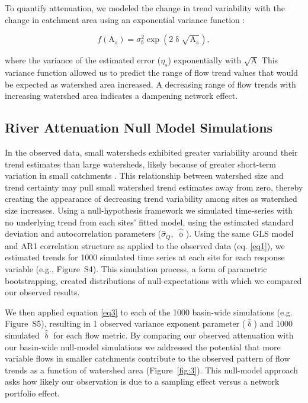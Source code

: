 \documentclass{AGUJournal}
\begin{document}
To quantify attenuation, we modeled the change in trend variability with the change in catchment area using an exponential variance function \citep[p.~211]{Pinheiro:2000}: 
\begin{linenomath*}
\begin{equation}
	f(\mathrm{A}_{s}) = \sigma_b^2 \exp(2\updelta\sqrt{\mathrm{A}_{s}}) \label{eq4},
\end{equation}
\end{linenomath*}
where the variance of the estimated error ($\eta_{s}$)  exponentially  with $\sqrt{\mathrm{A}}$  This variance function allowed us to predict the range of flow trend values that would be expected as watershed area increased. A decreasing range of flow trends with increasing watershed area indicates a dampening network effect.

\subsection{River Attenuation Null Model Simulations}

In the observed data, small watersheds exhibited greater variability around their trend estimates than large watersheds, likely because of greater short-term variation in small catchments \citep{Moore:2015}. This relationship between watershed size and trend certainty may pull small watershed trend estimates away from zero, thereby creating the appearance of decreasing trend variability among sites as watershed size increases. Using a null-hypothesis framework we simulated time-series with no underlying trend from each sites' fitted model, using the estimated standard deviation and autocorrelation parameters ($\hat{\sigma}_{Q}$, $\hat{\upphi}$). Using the same GLS model and AR1 correlation structure as applied to the observed data (eq. \ref{eq1}), we estimated trends for 1000 simulated time series at each site for each response variable (e.g., Figure~S4). This simulation process, a form of parametric bootstrapping, created distributions of null-expectations with which we compared our observed results.

We then applied equation \ref{eq3} to each of the 1000 basin-wide simulations (e.g. Figure~S5), resulting in 1 observed variance exponent parameter ($\hat{\updelta}$) and 1000 simulated $\hat{\updelta}$ for each flow metric. By comparing our observed attenuation with our basin-wide null-model simulations we addressed the potential that more variable flows in smaller catchments contribute to the observed pattern of flow trends as a function of watershed area (Figure~\ref{fig:3}). This null-model approach asks how likely our observation is due to a sampling effect versus a network portfolio effect.
\end{document}
